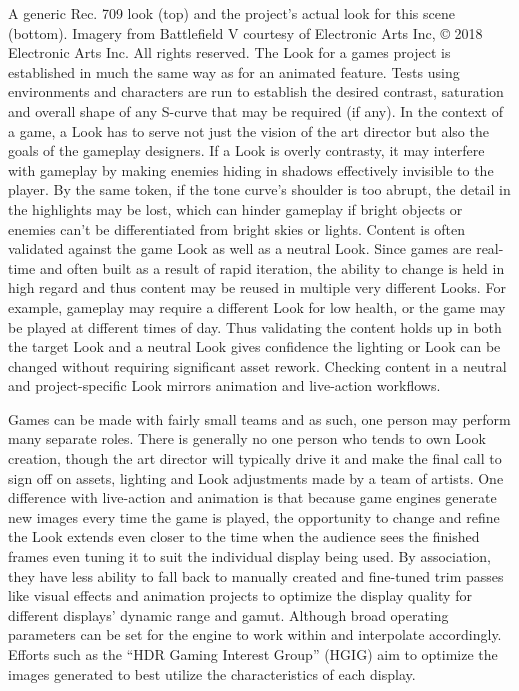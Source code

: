 A generic Rec. 709 look (top) and the project’s actual look for this scene (bottom).
Imagery from Battlefield V courtesy of Electronic Arts Inc, © 2018 Electronic Arts Inc. All rights reserved.
The Look for a games project is established in much the same way as for an animated feature. Tests using environments and characters are run to establish the desired contrast, saturation and overall shape of any S-curve that may be required (if any). In the context of a game, a Look has to serve not just the vision of the art director but also the goals of the gameplay designers. If a Look is overly contrasty, it may interfere with gameplay by making enemies hiding in shadows effectively invisible to the player. By the same token, if the tone curve’s shoulder is too abrupt, the detail in the highlights may be lost, which can hinder gameplay if bright objects or enemies can’t be differentiated from bright skies or lights. Content is often validated against the game Look as well as a neutral Look. Since games are real-time and often built as a result of rapid iteration, the ability to change is held in high regard and thus content may be reused in multiple very different Looks. For example, gameplay may require a different Look for low health, or the game may be played at different times of day. Thus validating the content holds up in both the target Look and a neutral Look gives confidence the lighting or Look can be changed without requiring significant asset rework. Checking content in a neutral and project-specific Look mirrors animation and live-action workflows.

Games can be made with fairly small teams and as such, one person may perform many separate roles. There is generally no one person who tends to own Look creation, though the art director will typically drive it and make the final call to sign off on assets, lighting and Look adjustments made by a team of artists. One difference with live-action and animation is that because game engines generate new images every time the game is played, the opportunity to change and refine the Look extends even closer to the time when the audience sees the finished frames even tuning it to suit the individual display being used. By association, they have less ability to fall back to manually created and fine-tuned trim passes like visual effects and animation projects to optimize the display quality for different displays’ dynamic range and gamut. Although broad operating parameters can be set for the engine to work within and interpolate accordingly. Efforts such as the “HDR Gaming Interest Group” (HGIG) aim to optimize the images generated to best utilize the characteristics of each display.

